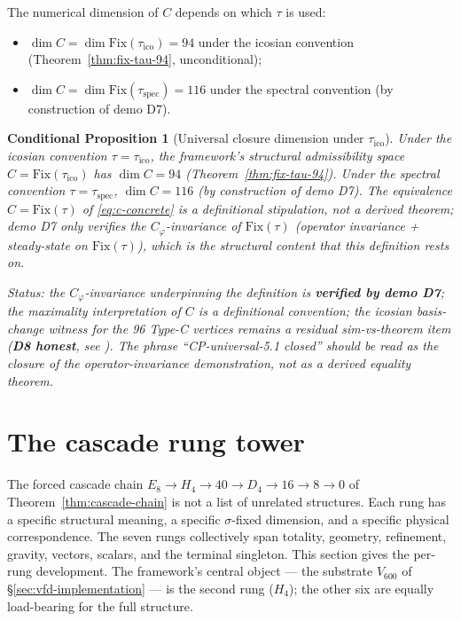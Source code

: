 \documentclass[11pt]{article}
\theoremstyle{plain}
\newtheorem{conditional}[theorem]{Conditional Proposition}
\theoremstyle{definition}
\theoremstyle{remark}
\newcommand{\Fix}{\mathrm{Fix}}
\newcommand{\Cph}{C_\varphi}
\begin{document}
The numerical dimension of $C$ depends on which $\tau$ is used:
\begin{itemize}[leftmargin=2em]
\item $\dim C = \dim \Fix(\tau_{\mathrm{ico}}) = 94$ under the icosian convention (Theorem~\ref{thm:fix-tau-94}, unconditional);
\item $\dim C = \dim \Fix(\tau_{\mathrm{spec}}) = 116$ under the spectral convention (by construction of demo D7).
\end{itemize}

\begin{conditional}[Universal closure dimension under $\tau_{\mathrm{ico}}$]\label{cthm:c-dim-94}
Under the icosian convention $\tau = \tau_{\mathrm{ico}}$, the framework's structural admissibility space $C = \Fix(\tau_{\mathrm{ico}})$ has $\dim C = 94$ (Theorem~\ref{thm:fix-tau-94}). Under the spectral convention $\tau = \tau_{\mathrm{spec}}$, $\dim C = 116$ (by construction of demo D7). The equivalence $C = \Fix(\tau)$ of \eqref{eq:c-concrete} is a definitional stipulation, not a derived theorem; demo D7 only verifies the $\Cph$-invariance of $\Fix(\tau)$ (operator invariance + steady-state on $\Fix(\tau)$), which is the structural content that this definition rests on.

\noindent\emph{Status:} the $\Cph$-invariance underpinning the definition is \textbf{verified by demo D7}; the maximality interpretation of $C$ is a definitional convention; the icosian basis-change witness for the 96 Type-C vertices remains a residual sim-vs-theorem item (\textbf{D8 honest}, see \citet{PerObserverZeroLine}). The phrase ``CP-universal-5.1 closed'' should be read as the closure of the operator-invariance demonstration, not as a derived equality theorem.
\end{conditional}

\section{The cascade rung tower}\label{sec:rung-tower}

The forced cascade chain $E_8 \to H_4 \to 40 \to D_4 \to 16 \to 8 \to 0$ of Theorem~\ref{thm:cascade-chain} is not a list of unrelated structures. Each rung has a specific structural meaning, a specific $\sigma$-fixed dimension, and a specific physical correspondence. The seven rungs collectively span totality, geometry, refinement, gravity, vectors, scalars, and the terminal singleton. This section gives the per-rung development. The framework's central object --- the substrate $V_{600}$ of \S\ref{sec:vfd-implementation} --- is the second rung ($H_4$); the other six are equally load-bearing for the full structure.
\end{document}
